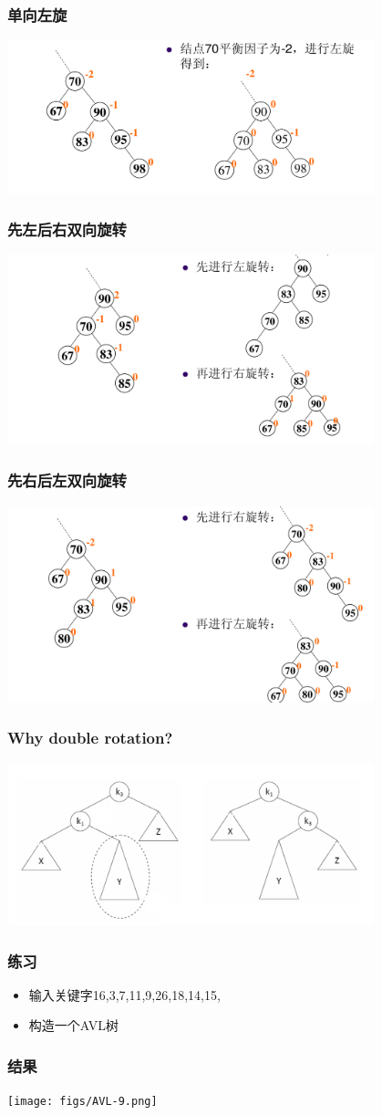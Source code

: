 \begin{frame}[fragile]
  \frametitle{单向左旋}
  \includegraphics[width=0.8\textwidth]{figs/AVL-5.png}
\end{frame}


\begin{frame}[fragile]
  \frametitle{先左后右双向旋转}
  \includegraphics[width=0.8\textwidth]{figs/AVL-6.png}
\end{frame}


\begin{frame}[fragile]
  \frametitle{先右后左双向旋转}
  \includegraphics[width=0.8\textwidth]{figs/AVL-7.png}
\end{frame}


\begin{frame}[fragile]
  \frametitle{Why double rotation?}
  \includegraphics[width=0.8\textwidth]{figs/AVL-8.png}
\end{frame}

\begin{frame}[fragile]
  \frametitle{练习}
  \begin{itemize}
  \item 输入关键字16,3,7,11,9,26,18,14,15,
  \item 构造一个AVL树
  \end{itemize}
\end{frame}

\begin{frame}[fragile]
  \frametitle{结果}
  \texttt{[image: figs/AVL-9.png]}
\end{frame}


